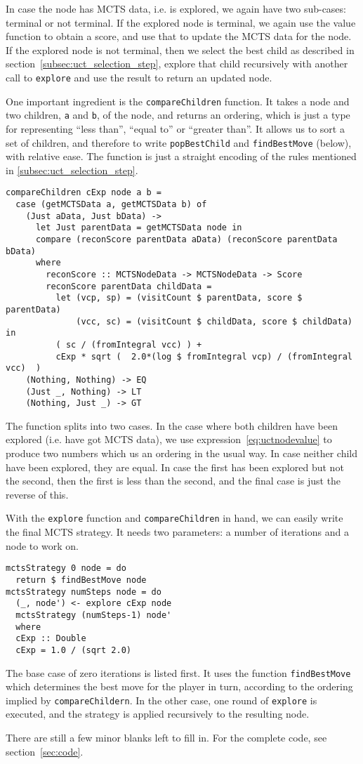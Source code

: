 In case the node has MCTS data, i.e. is explored, we again have two sub-cases: terminal or not terminal.
If the explored node is terminal, we again use the value function to obtain a score, and use that to update the MCTS data for the node.
If the explored node is not terminal, then we select the best child as described in section~\ref{subsec:uct_selection_step}, explore that child recursively with another call to \texttt{explore} and use the result to return an updated node.

One important ingredient is the \texttt{compareChildren} function. It takes a node and two children, \texttt{a} and \texttt{b}, of the node, and returns an ordering, which is just a type for representing ``less than'', ``equal to'' or ``greater than''.
It allows us to sort a set of children, and therefore to write \texttt{popBestChild} and \texttt{findBestMove} (below), with relative ease.
The function is just a straight encoding of the rules mentioned in \ref{subsec:uct_selection_step}.
\begin{lstlisting}[frame=single]
compareChildren cExp node a b =
  case (getMCTSData a, getMCTSData b) of
    (Just aData, Just bData) ->
      let Just parentData = getMCTSData node in
      compare (reconScore parentData aData) (reconScore parentData bData)    
      where
        reconScore :: MCTSNodeData -> MCTSNodeData -> Score
        reconScore parentData childData =
          let (vcp, sp) = (visitCount $ parentData, score $ parentData)
              (vcc, sc) = (visitCount $ childData, score $ childData) in
          ( sc / (fromIntegral vcc) ) +
          cExp * sqrt (  2.0*(log $ fromIntegral vcp) / (fromIntegral vcc)  )
    (Nothing, Nothing) -> EQ
    (Just _, Nothing) -> LT
    (Nothing, Just _) -> GT
\end{lstlisting}
The function splits into two cases. In the case where both children have been explored (i.e. have got MCTS data), we use expression~\eqref{eq:uctnodevalue} to produce two numbers which us an ordering in the usual way. In case neither child have been explored, they are equal. In case the first has been explored but not the second, then the first is less than the second, and the final case is just the reverse of this.

With the \texttt{explore} function and \texttt{compareChildren} in hand, we can easily write the final MCTS strategy. It needs two parameters: a number of iterations and a node to work on.

\begin{minipage}{\linewidth}
\begin{lstlisting}[frame=single]
mctsStrategy 0 node = do
  return $ findBestMove node
mctsStrategy numSteps node = do
  (_, node') <- explore cExp node
  mctsStrategy (numSteps-1) node'
  where
  cExp :: Double  
  cExp = 1.0 / (sqrt 2.0)
\end{lstlisting}
\end{minipage}
The base case of zero iterations is listed first. It uses the function \texttt{findBestMove} which determines the best move for the player in turn, according to the ordering implied by \texttt{compareChildern}. In the other case, one round of \texttt{explore} is executed, and the strategy is applied recursively to the resulting node.

There are still a few minor blanks left to fill in. For the complete code, see section~\ref{sec:code}.
